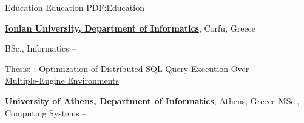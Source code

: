 
\Section
{Education}
{Education}
{PDF:Education}

\Entry
\href{http://www.ionio.gr}
{\textbf{Ionian University, Department of Informatics}},
Corfu, Greece

\Gap
\BulletItem
BSc., Informatics
\hfill
{} --
\begin{Detail}
\SubBulletItem
Thesis:
\href{http://www.cslab.ece.ntua.gr/~vgian/papers/thesis.pdf}
{: Optimization of Distributed SQL Query Execution Over \\Multiple-Engine Environments}
\end{Detail}

\Entry
\href{http://di.uoa.gr/eng}
{\textbf{University of Athens, Department of Informatics}},
Athens, Greece
\Gap
\BulletItem
MSc., Computing Systems
\hfill
{} --

